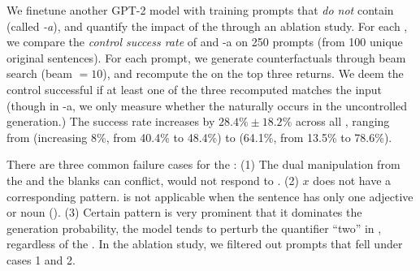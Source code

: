 We finetune another GPT-2 model with training prompts that \emph{do not} contain \tagstrs (called \emph{\sysname-a}), and quantify the impact of the \tagstrshorts through an ablation study.
For each \tagstr, we compare the \emph{control success rate} of \sysname and \sysname-a on 250 prompts (from 100 unique original sentences).
For each prompt, we generate counterfactuals through beam search (beam $=10$), and recompute the \tagstrshorts on the top three returns.
We deem the control successful if at least one of the three recomputed \tagstrshorts matches the input (though in \sysname-a, we only measure whether the \tagstrshort naturally occurs in the uncontrolled generation.)
The success rate increases by $28.4\% \pm 18.2\%$ across all \tagstrs, ranging from  (increasing 8\%, from 40.4\% to 48.4\%) to  (64.1\%, from 13.5\% to 78.6\%).

There are three common failure cases for the \tagstrshorts:
(1) The dual manipulation from the \tagstrs and the blanks can conflict, \eg {} would not respond to .
(2) $x$ does not have a corresponding pattern.  is not applicable when the sentence has only one adjective or noun (\eg {}).
(3) Certain pattern is very prominent that it dominates the generation probability, \eg the model tends to perturb the quantifier ``two'' in , regardless of the \tagstrshort.
In the ablation study, we filtered out prompts that fell under cases 1 and 2.







